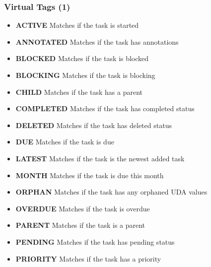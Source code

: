 \documentclass[t]{beamer}
\begin{document}
\begin{frame}[fragile]\frametitle{Virtual Tags (1)}
    \begin{itemize}
        \item \textbf{ACTIVE}       Matches if the task is started
        \item \textbf{ANNOTATED}    Matches if the task has annotations
        \item \textbf{BLOCKED}      Matches if the task is blocked
        \item \textbf{BLOCKING}     Matches if the task is blocking
        \item \textbf{CHILD}        Matches if the task has a parent
        \item \textbf{COMPLETED}    Matches if the task has completed status
        \item \textbf{DELETED}      Matches if the task has deleted status
        \item \textbf{DUE}          Matches if the task is due
        \item \textbf{LATEST}       Matches if the task is the newest added task
        \item \textbf{MONTH}        Matches if the task is due this month
        \item \textbf{ORPHAN}       Matches if the task has any orphaned UDA values
        \item \textbf{OVERDUE}      Matches if the task is overdue
        \item \textbf{PARENT}       Matches if the task is a parent
        \item \textbf{PENDING}      Matches if the task has pending status
        \item \textbf{PRIORITY}     Matches if the task has a priority
    \end{itemize}
\end{frame}
\end{document}
